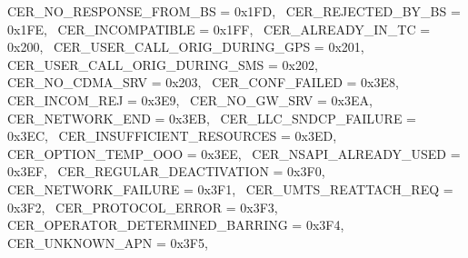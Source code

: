 \begin{DoxyItemize}
 C\+E\+R\+\_\+\+N\+O\+\_\+\+R\+E\+S\+P\+O\+N\+S\+E\+\_\+\+F\+R\+O\+M\+\_\+\+BS = 0x1\+FD,~\newline
 C\+E\+R\+\_\+\+R\+E\+J\+E\+C\+T\+E\+D\+\_\+\+B\+Y\+\_\+\+BS = 0x1\+FE,~\newline
 C\+E\+R\+\_\+\+I\+N\+C\+O\+M\+P\+A\+T\+I\+B\+LE = 0x1\+FF,~\newline
 C\+E\+R\+\_\+\+A\+L\+R\+E\+A\+D\+Y\+\_\+\+I\+N\+\_\+\+TC = 0x200,~\newline
 C\+E\+R\+\_\+\+U\+S\+E\+R\+\_\+\+C\+A\+L\+L\+\_\+\+O\+R\+I\+G\+\_\+\+D\+U\+R\+I\+N\+G\+\_\+\+G\+PS = 0x201,~\newline
 C\+E\+R\+\_\+\+U\+S\+E\+R\+\_\+\+C\+A\+L\+L\+\_\+\+O\+R\+I\+G\+\_\+\+D\+U\+R\+I\+N\+G\+\_\+\+S\+MS = 0x202,~\newline
 C\+E\+R\+\_\+\+N\+O\+\_\+\+C\+D\+M\+A\+\_\+\+S\+RV = 0x203,~\newline
 C\+E\+R\+\_\+\+C\+O\+N\+F\+\_\+\+F\+A\+I\+L\+ED = 0x3\+E8,~\newline
 C\+E\+R\+\_\+\+I\+N\+C\+O\+M\+\_\+\+R\+EJ = 0x3\+E9,~\newline
 C\+E\+R\+\_\+\+N\+O\+\_\+\+G\+W\+\_\+\+S\+RV = 0x3\+EA,~\newline
 C\+E\+R\+\_\+\+N\+E\+T\+W\+O\+R\+K\+\_\+\+E\+ND = 0x3\+EB,~\newline
 C\+E\+R\+\_\+\+L\+L\+C\+\_\+\+S\+N\+D\+C\+P\+\_\+\+F\+A\+I\+L\+U\+RE = 0x3\+EC,~\newline
 C\+E\+R\+\_\+\+I\+N\+S\+U\+F\+F\+I\+C\+I\+E\+N\+T\+\_\+\+R\+E\+S\+O\+U\+R\+C\+ES = 0x3\+ED,~\newline
 C\+E\+R\+\_\+\+O\+P\+T\+I\+O\+N\+\_\+\+T\+E\+M\+P\+\_\+\+O\+OO = 0x3\+EE,~\newline
 C\+E\+R\+\_\+\+N\+S\+A\+P\+I\+\_\+\+A\+L\+R\+E\+A\+D\+Y\+\_\+\+U\+S\+ED = 0x3\+EF,~\newline
 C\+E\+R\+\_\+\+R\+E\+G\+U\+L\+A\+R\+\_\+\+D\+E\+A\+C\+T\+I\+V\+A\+T\+I\+ON = 0x3\+F0,~\newline
 C\+E\+R\+\_\+\+N\+E\+T\+W\+O\+R\+K\+\_\+\+F\+A\+I\+L\+U\+RE = 0x3\+F1,~\newline
 C\+E\+R\+\_\+\+U\+M\+T\+S\+\_\+\+R\+E\+A\+T\+T\+A\+C\+H\+\_\+\+R\+EQ = 0x3\+F2,~\newline
 C\+E\+R\+\_\+\+P\+R\+O\+T\+O\+C\+O\+L\+\_\+\+E\+R\+R\+OR = 0x3\+F3,~\newline
 C\+E\+R\+\_\+\+O\+P\+E\+R\+A\+T\+O\+R\+\_\+\+D\+E\+T\+E\+R\+M\+I\+N\+E\+D\+\_\+\+B\+A\+R\+R\+I\+NG = 0x3\+F4,~\newline
 C\+E\+R\+\_\+\+U\+N\+K\+N\+O\+W\+N\+\_\+\+A\+PN = 0x3\+F5,~\newline

\end{DoxyItemize}
